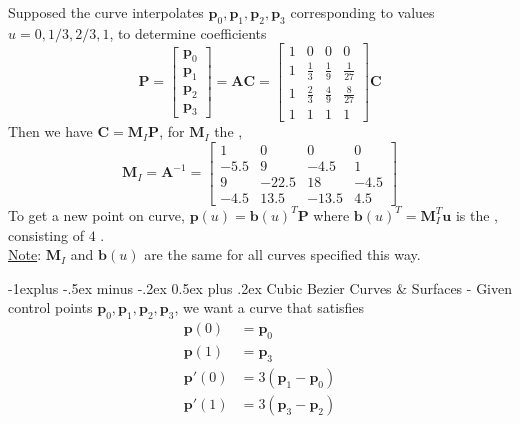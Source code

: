 \documentclass[10pt,landscape,letterpaper]{article}
\makeatletter
\renewcommand{\subsection}{\@startsection{subsection}{2}{0mm}%
                                {-1explus -.5ex minus -.2ex}%
                                {0.5ex plus .2ex}%
                                {\sffamily\normalsize\itshape}}
\makeatother
\begin{document}
\begin{multicols}{3}
Supposed the curve interpolates $\mathbf{p}_0, \mathbf{p}_1, \mathbf{p}_2, \mathbf{p}_3$ corresponding to values $u = 0, 1/3, 2/3, 1$, to determine coefficients
\[
\mathbf{P} = \begin{bmatrix}
    \mathbf{p}_0 \\ \mathbf{p}_1 \\ \mathbf{p}_2 \\ \mathbf{p}_3
\end{bmatrix}
= \mathbf{AC}
= \begin{bmatrix}
1   &0              &0              &0               \\
1   &\frac{1}{3}    &\frac{1}{9}    &\frac{1}{27}    \\
1   &\frac{2}{3}    &\frac{4}{9}    &\frac{8}{27}    \\
1   &1              &1              &1
\end{bmatrix} \mathbf{C}
\]
Then we have $\mathbf{C} = \mathbf{M}_I\mathbf{P}$, for $\mathbf{M}_I$ the ,
\[
\mathbf{M}_I = \mathbf{A}^{-1}
= \begin{bmatrix}
1       &0              &0              &0      \\
-5.5    &9              &-4.5           &1      \\
9       &-22.5          &18             &-4.5   \\
-4.5    &13.5           &-13.5          &4.5
\end{bmatrix}
\]
To get a new point on curve, $\mathbf{p}(u) = \mathbf{b}(u)^T\mathbf{P}$ where $\mathbf{b}(u)^T = \mathbf{M}_I^T \mathbf{u}$ is the , consisting of $4$ .
\\
\underline{Note}: $\mathbf{M}_I$ and $\mathbf{b}(u)$ are the same for all curves specified this way.


\subsection{Cubic Bezier Curves \& Surfaces}
 - Given control points $\mathbf{p}_0, \mathbf{p}_1, \mathbf{p}_2, \mathbf{p}_3$, we want a curve that satisfies
\begin{align*}
    \mathbf{p}(0) &= \mathbf{p}_0
    \\
    \mathbf{p}(1) &= \mathbf{p}_3
    \\
    \mathbf{p}'(0) &= 3(\mathbf{p}_1 - \mathbf{p}_0)
    \\
    \mathbf{p}'(1) &= 3(\mathbf{p}_3 - \mathbf{p}_2)
\end{align*}


\end{multicols}
\end{document}
